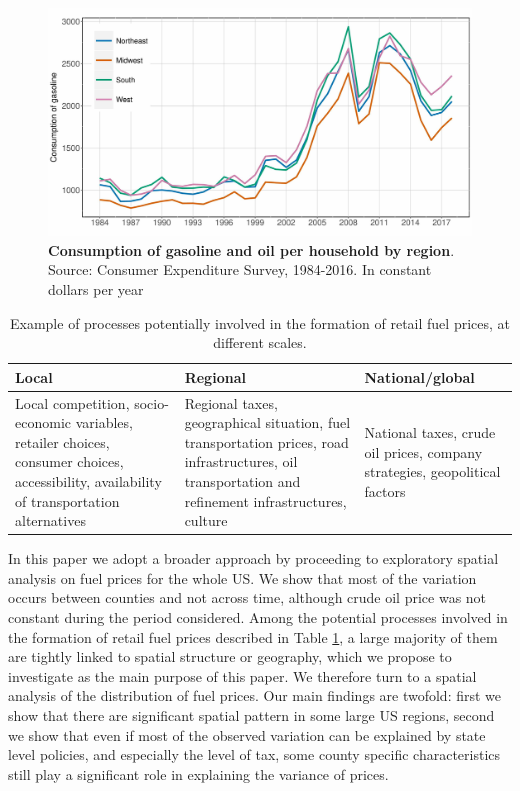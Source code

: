 \documentclass[10pt]{article}
\begin{document}
\begin{figure}
\centering
\includegraphics[width=0.6\linewidth]{Fig3.jpg}
\caption{\textbf{Consumption of gasoline and oil per household by region}. Source: Consumer Expenditure Survey, 1984-2016. In constant dollars per year \label{fig:consumption_gas}
}
\end{figure}


\begin{table}
	\centering
\caption{Example of processes potentially involved in the formation of retail fuel prices, at different scales.}
\medskip
\label{tab:processes}
\begin{tabular}{|p{5cm}|p{5cm}|p{5cm}|}
\hline
\textbf{Local} & \textbf{Regional} & \textbf{National/global}  \\
\hline
Local competition, socio-economic variables, retailer choices, consumer choices, accessibility, availability of transportation alternatives & Regional taxes, geographical situation, fuel transportation prices, road infrastructures, oil transportation and refinement infrastructures, culture  & National taxes, crude oil prices, company strategies, geopolitical factors \\
\hline
\end{tabular}
\end{table}


In this paper we adopt a broader approach by proceeding to exploratory spatial analysis on fuel prices for the whole US. We show that most of the variation occurs between counties and not across time, although crude oil price was not constant during the period considered. Among the potential processes involved in the formation of retail fuel prices described in Table \ref{tab:processes}, a large majority of them are tightly linked to spatial structure or geography, which we propose to investigate as the main purpose of this paper. We therefore turn to a spatial analysis of the distribution of fuel prices. Our main findings are twofold: first we show that there are significant spatial pattern in some large US regions, second we show that even if most of the observed variation can be explained by state level policies, and especially the level of tax, some county specific characteristics still play a significant role in explaining the variance of prices.
\end{document}
